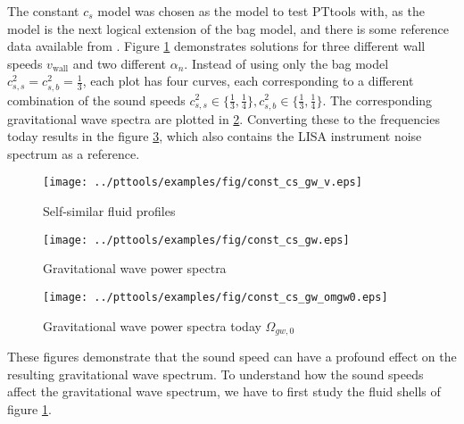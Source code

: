 The constant $c_s$ model was chosen as the model to test PTtools with,
as the model is the next logical extension of the bag model,
and there is some reference data available from \cites{giese_2020}{giese_2021}.
Figure \ref{fig:fluid_profiles} demonstrates solutions for three different wall speeds $v_\text{wall}$ and two different $\alpha_n$.
Instead of using only the bag model $c_{s,s}^2 = c_{s,b}^2 = \frac{1}{3}$,
each plot has four curves, each corresponding to a different combination of the sound speeds
$c_{s,s}^2 \in \{ \frac{1}{3}, \frac{1}{4} \}, c_{s,b}^2 \in \{ \frac{1}{3}, \frac{1}{4} \}$.
The corresponding gravitational wave spectra are plotted in \ref{fig:gw_spectra}.
Converting these to the frequencies today results in the figure \ref{fig:omgw0},
which also contains the LISA instrument noise spectrum as a reference.

\begin{figure}[ht!]
\centering
\texttt{[image: ../pttools/examples/fig/const\_cs\_gw\_v.eps]}
\caption{Self-similar fluid profiles}
\label{fig:fluid_profiles}
\end{figure}

\begin{figure}[ht!]
\centering
\texttt{[image: ../pttools/examples/fig/const\_cs\_gw.eps]}
\caption{Gravitational wave power spectra}
\label{fig:gw_spectra}
\end{figure}

\begin{figure}[ht!]
\centering
\texttt{[image: ../pttools/examples/fig/const\_cs\_gw\_omgw0.eps]}
\caption{Gravitational wave power spectra today $\Omega_{gw,0}$}
\label{fig:omgw0}
\end{figure}

These figures demonstrate that the sound speed can have a profound effect on the resulting gravitational wave spectrum.
To understand how the sound speeds affect the gravitational wave spectrum,
we have to first study the fluid shells of figure \ref{fig:fluid_profiles}.

